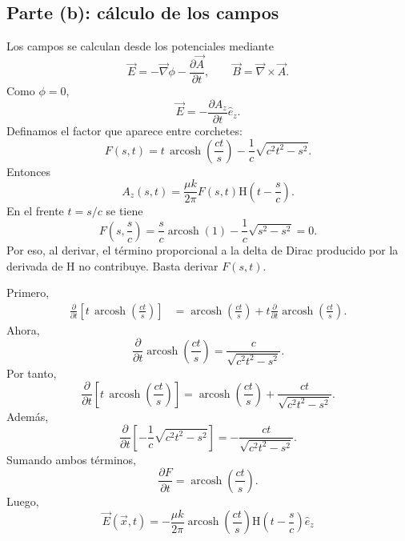 \documentclass{article}
\numberwithin{equation}{section}
\newcommand{\Hh}{\mathrm H}
\newcommand{\arcosh}{\operatorname{arcosh}}
\begin{document}
\subsection{Parte (b): cálculo de los campos}

Los campos se calculan desde los potenciales mediante
\begin{equation*}
    \vec E=-\vec\nabla\phi-\frac{\partial\vec A}{\partial t},
    \qquad
    \vec B=\vec\nabla\times\vec A.
\end{equation*}
Como $\phi=0$,
\begin{equation*}
    \vec E=-\frac{\partial A_z}{\partial t}\hat e_z.
\end{equation*}
Definamos el factor que aparece entre corchetes:
\begin{equation*}
    F(s,t)=t\,\arcosh\left(\frac{ct}{s}\right)
    -\frac{1}{c}\sqrt{c^2t^2-s^2}.
\end{equation*}
Entonces
\begin{equation*}
    A_z(s,t)=\frac{\mu k}{2\pi}F(s,t)\Hh\left(t-\frac{s}{c}\right).
\end{equation*}
En el frente $t=s/c$ se tiene
\begin{equation*}
    F\left(s,\frac{s}{c}\right)
    =\frac{s}{c}\arcosh(1)-\frac{1}{c}\sqrt{s^2-s^2}=0.
\end{equation*}
Por eso, al derivar, el término proporcional a la delta de Dirac producido por la derivada de $\Hh$ no contribuye. Basta derivar $F(s,t)$.

Primero,
\begin{align*}
    \frac{\partial}{\partial t}
    \left[t\,\arcosh\left(\frac{ct}{s}\right)\right]
    &=\arcosh\left(\frac{ct}{s}\right)
    +t\frac{\partial}{\partial t}\arcosh\left(\frac{ct}{s}\right).
\end{align*}
Ahora,
\begin{equation*}
    \frac{\partial}{\partial t}\arcosh\left(\frac{ct}{s}\right)
    =\frac{c}{\sqrt{c^2t^2-s^2}}.
\end{equation*}
Por tanto,
\begin{equation*}
    \frac{\partial}{\partial t}
    \left[t\,\arcosh\left(\frac{ct}{s}\right)\right]
    =\arcosh\left(\frac{ct}{s}\right)
    +\frac{ct}{\sqrt{c^2t^2-s^2}}.
\end{equation*}
Además,
\begin{equation*}
    \frac{\partial}{\partial t}
    \left[-\frac{1}{c}\sqrt{c^2t^2-s^2}\right]
    =-\frac{ct}{\sqrt{c^2t^2-s^2}}.
\end{equation*}
Sumando ambos términos,
\begin{equation*}
    \frac{\partial F}{\partial t}
    =\arcosh\left(\frac{ct}{s}\right).
\end{equation*}
Luego,
\begin{equation*}
    \boxed{
    \vec E(\vec x,t)
    =-\frac{\mu k}{2\pi}
    \arcosh\left(\frac{ct}{s}\right)
    \Hh\left(t-\frac{s}{c}\right)\hat e_z
    }
\end{equation*}
\end{document}
